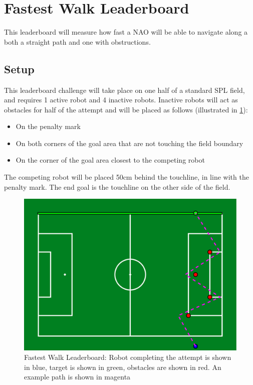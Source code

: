 
\section{Fastest Walk Leaderboard}
This leaderboard will measure how fast a NAO will be able to navigate along a both a straight path and one with obstructions.

\subsection{Setup}
This leaderboard challenge will take place on one half of a standard SPL field, and requires 1 active robot and 4 inactive robots.
Inactive robots will act as obstacles for half of the attempt and will be placed as follows (illustrated in \cref{fig:walk_leaderboard}):
\begin{itemize}
    \item On the penalty mark
    \item On both corners of the goal area that are not touching the field boundary
    \item On the corner of the goal area closest to the competing robot
\end{itemize}

The competing robot will be placed 50cm behind the touchline, in line with the penalty mark.
The end goal is the touchline on the other side of the field.

\begin{figure}[t]
    \centerline{\includegraphics[width=\columnwidth]{figs/walk_leaderboard.pdf}}
    \caption{Fastest Walk Leaderboard: Robot completing the attempt is shown in blue, target is shown in green, obstacles are shown in red. An example path is shown in magenta}
    \label{fig:walk_leaderboard}
\end{figure}

